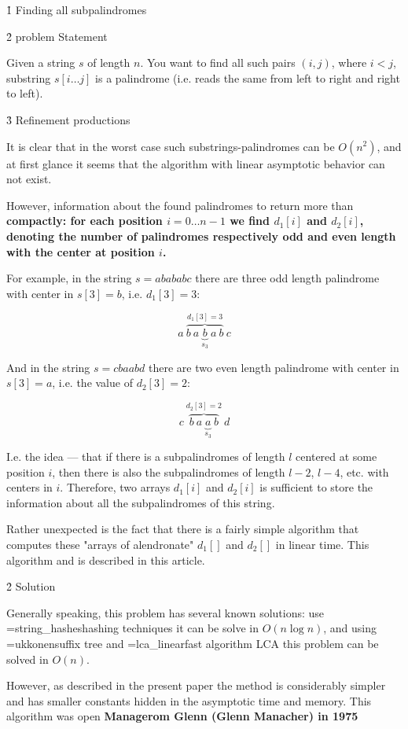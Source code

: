 \h1{ Finding all subpalindromes }


\h2{ problem Statement }

Given a string $s$ of length $n$. You want to find all such pairs $(i,j)$, where $i<j$, substring $s[i \ldots j]$ is a palindrome (i.e. reads the same from left to right and right to left).


\h3{ Refinement productions }

It is clear that in the worst case such substrings-palindromes can be $O(n^2)$, and at first glance it seems that the algorithm with linear asymptotic behavior can not exist.

However, information about the found palindromes to return more than \bf{compactly}: for each position $i=0 \ldots n-1$ we find $d_1[i]$ and $d_2[i]$, denoting the number of palindromes respectively odd and even length with the center at position $i$.

For example, in the string $s = abababc$ there are three odd length palindrome with center in $s[3]=b$, i.e. $d_1[3]=3$:

$$ a\ \overbrace{b\ a\ \underbrace{b}_{s_3}\ a\ b}^{d_1[3]=3}\ c $$

And in the string $s = cbaabd$ there are two even length palindrome with center in $s[3]=a$, i.e. the value of $d_2[3]=2$:

$$ c\ \overbrace{b\ a\ \underbrace{a}_{s_3}\ b}^{d_2[3]=2}\ d $$

I.e. the idea --- that if there is a subpalindromes of length $l$ centered at some position $i$, then there is also the subpalindromes of length $l-2$, $l-4$, etc. with centers in $i$. Therefore, two arrays $d_1[i]$ and $d_2[i]$ is sufficient to store the information about all the subpalindromes of this string.

Rather unexpected is the fact that there is a fairly simple algorithm that computes these "arrays of alendronate" $d_1[]$ and $d_2[]$ in linear time. This algorithm and is described in this article.


\h2{ Solution }

Generally speaking, this problem has several known solutions: use \algohref=string_hashes{hashing techniques} it can be solve in $O (n \log n)$, and using \algohref=ukkonen{suffix tree} and \algohref=lca_linear{fast algorithm LCA} this problem can be solved in $O (n)$.

However, as described in the present paper the method is considerably simpler and has smaller constants hidden in the asymptotic time and memory. This algorithm was open \bf{Managerom Glenn (Glenn Manacher)} in 1975


